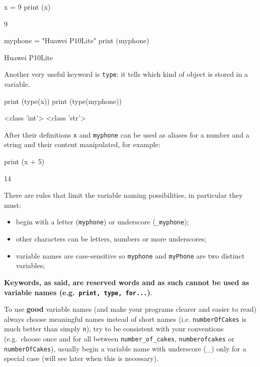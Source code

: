 \begin{ipython}
x = 9 
print (x)
\end{ipython}
\begin{ioutput}
9
\end{ioutput}
\begin{ipython}
myphone = "Huawei P10Lite" 
print (myphone)
\end{ipython}
\begin{ioutput}
Huawei P10Lite	
\end{ioutput}

Another very useful keyword is \texttt{type}: it tells which kind of object is stored in a variable.

\begin{ipython}
print (type(x))
print (type(myphone))
\end{ipython}
\begin{ioutput}
<class 'int'>
<class 'str'>
\end{ioutput}

After their definitions \texttt{x} and \texttt{myphone} can be used as aliases for a number and a string and their content manipulated, for example:

\begin{ipython}
print (x + 5)
\end{ipython}
\begin{ioutput}
14
\end{ioutput}

There are rules that limit the variable naming possibilities, in particular they must:
\begin{itemize}
	\tightlist
\item begin with a letter (\texttt{myphone}) or underscore (\texttt{\_myphone});
\item other characters can be letters, numbers or more underscores;
\item variable names are case-sensitive so \texttt{myphone} and \texttt{myPhone} are two distinct variables;
\end{itemize}

\textbf{Keywords, as said, are reserved words and as such cannot be used as variable names (e.g.~\texttt{print, type, for...})}.

To use \textbf{good} variable names (and make your programs clearer and easier to read) always choose meaningful names instead of short names (i.e. \texttt{numberOfCakes} is much better than simply \texttt{n}), try to be consistent with your conventions (e.g.~choose once and for all between \texttt{number\_of\_cakes}, \texttt{numberofcakes} or \texttt{numberOfCakes}), usually begin a variable name with underscore (\_) only for a special case (will see later when this is necessary).

